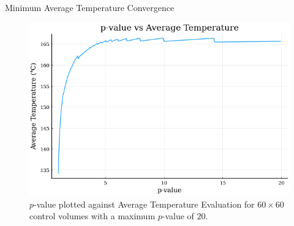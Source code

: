 \documentclass[final]{beamer}
\begin{document}
\begin{frame}{Minimum Average Temperature Convergence}
	\begin{figure}
		\centering
		\includegraphics[width=0.9\linewidth]{60x60-p_vs_T.png}
		\caption[$p$-value vs. $T_{av}$]{$p$-value plotted against Average Temperature Evaluation for $60\times 60$ control volumes with a maximum $p$-value of $20$.}
		\label{fig:p-vs-T}
	\end{figure}
\end{frame}
\end{document}
